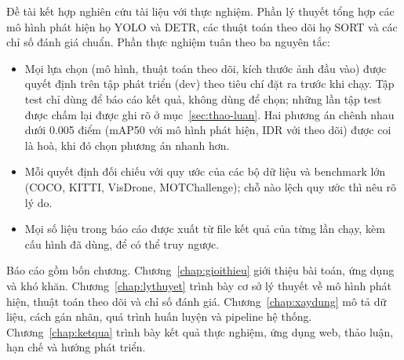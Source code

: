 
Đề tài kết hợp nghiên cứu tài liệu với thực nghiệm. Phần lý thuyết tổng hợp các mô hình phát hiện họ YOLO và DETR,
các thuật toán theo dõi họ SORT và các chỉ số đánh giá chuẩn. Phần thực nghiệm tuân theo ba nguyên tắc:
\begin{itemize}
  \item Mọi lựa chọn (mô hình, thuật toán theo dõi, kích thước ảnh đầu vào) được quyết định trên tập phát triển (dev)
        theo tiêu chí đặt ra trước khi chạy. Tập test chỉ dùng để báo cáo kết quả, không dùng để chọn; những lần tập
        test được chấm lại được ghi rõ ở mục~\ref{sec:thao-luan}. Hai phương án chênh nhau dưới 0.005 điểm (mAP50 với
        mô hình phát hiện, IDR với theo dõi) được coi là hoà, khi đó chọn phương án nhanh hơn.
  \item Mỗi quyết định đối chiếu với quy ước của các bộ dữ liệu và benchmark lớn (COCO, KITTI, VisDrone, MOTChallenge);
        chỗ nào lệch quy ước thì nêu rõ lý do.
  \item Mọi số liệu trong báo cáo được xuất từ file kết quả của từng lần chạy, kèm cấu hình đã dùng, để có thể truy
        ngược.
\end{itemize}

Báo cáo gồm bốn chương. Chương~\ref{chap:gioithieu} giới thiệu bài toán, ứng dụng và khó khăn.
Chương~\ref{chap:lythuyet} trình bày cơ sở lý thuyết về mô hình phát hiện, thuật toán theo dõi và chỉ số đánh giá.
Chương~\ref{chap:xaydung} mô tả dữ liệu, cách gán nhãn, quá trình huấn luyện và pipeline hệ thống.
Chương~\ref{chap:ketqua} trình bày kết quả thực nghiệm, ứng dụng web, thảo luận, hạn chế và hướng phát triển.
